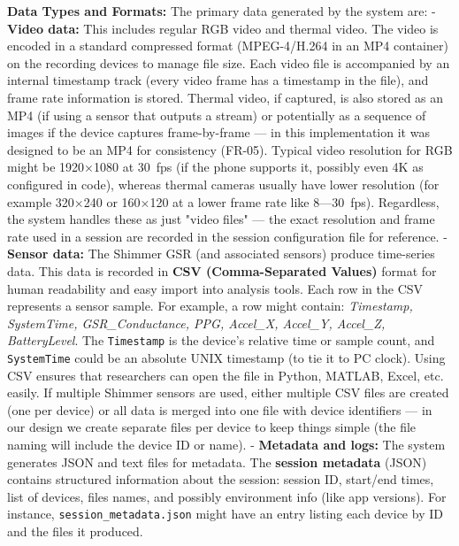 \textbf{Data Types and Formats:} The primary data generated by the system
are: - \textbf{Video data:} This includes regular RGB video and thermal
video. The video is encoded in a standard compressed format
(MPEG-4/H.264 in an MP4 container) on the recording devices to manage
file size. Each video file is accompanied by an internal timestamp track
(every video frame has a timestamp in the file), and frame rate
information is stored. Thermal video, if captured, is also stored as an
MP4 (if using a sensor that outputs a stream) or potentially as a
sequence of images if the device captures frame-by-frame --- in this
implementation it was designed to be an MP4 for consistency (FR-05).
Typical video resolution for RGB might be 1920×1080 at 30 fps (if the
phone supports it, possibly even 4K as configured in
code\cite{CameraRecorder}\cite{CameraRecorder}),
whereas thermal cameras usually have lower resolution (for example
320×240 or 160×120 at a lower frame rate like 8---30 fps). Regardless,
the system handles these as just "video files" --- the exact resolution
and frame rate used in a session are recorded in the session
configuration
file\cite{SessionManagerKt}\cite{DriverStressThermal2020}
for reference. - \textbf{Sensor data:} The Shimmer GSR (and associated
sensors) produce time-series data. This data is recorded in \textbf{CSV
(Comma-Separated Values)} format for human readability and easy import
into analysis tools. Each row in the CSV represents a sensor sample. For
example, a row might contain: \textit{Timestamp, SystemTime, GSR_Conductance,
PPG, Accel_X, Accel_Y, Accel_Z,
BatteryLevel}\cite{ShimmerRecorder}.
The \texttt{Timestamp} is the device's relative time or sample count, and
\texttt{SystemTime} could be an absolute UNIX timestamp (to tie it to PC
clock). Using CSV ensures that researchers can open the file in Python,
MATLAB, Excel, etc. easily. If multiple Shimmer sensors are used, either
multiple CSV files are created (one per device) or all data is merged
into one file with device identifiers --- in our design we create
separate files per device to keep things simple (the file naming will
include the device ID or name). - \textbf{Metadata and logs:} The system
generates JSON and text files for metadata. The \textbf{session metadata}
(JSON) contains structured information about the session: session ID,
start/end times, list of devices, files names, and possibly environment
info (like app versions). For instance, \texttt{session_metadata.json} might
have an entry listing each device by ID and the files it
produced\cite{SessionManager}\cite{SessionManager}.
